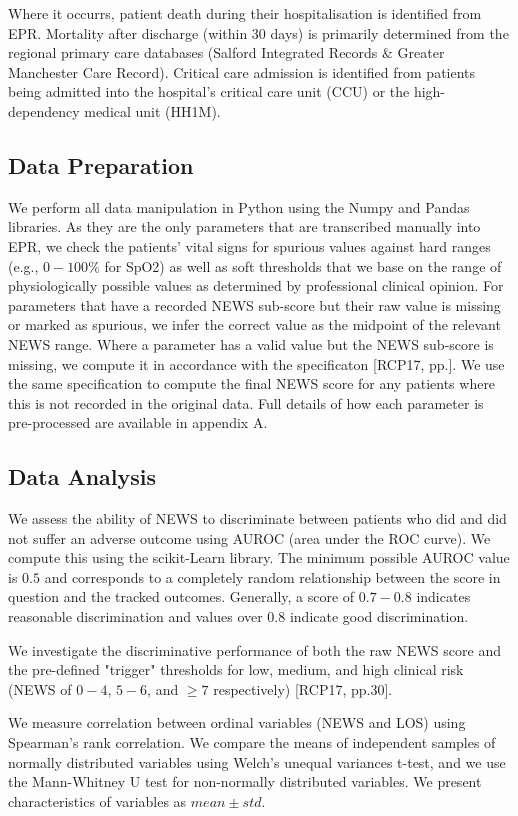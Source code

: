 \documentclass[10pt,journal,compsoc]{IEEEtran}
\begin{document}
Where it occurrs, patient death during their hospitalisation is identified from EPR. Mortality after discharge (within 30 days) is primarily determined from the regional primary care databases (Salford Integrated Records \& Greater Manchester Care Record). Critical care admission is identified from patients being admitted into the hospital's critical care unit (CCU) or the high-dependency medical unit (HH1M).

\subsection{Data Preparation} We perform all data manipulation in Python using the Numpy and Pandas libraries. As they are the only parameters that are transcribed manually into EPR, we check the patients' vital signs for spurious values against hard ranges (e.g., $0-100\%$ for SpO2) as well as soft thresholds that we base on the range of physiologically possible values as determined by professional clinical opinion. For parameters that have a recorded NEWS sub-score but their raw value is missing or marked as spurious, we infer the correct value as the midpoint of the relevant NEWS range. Where a parameter has a valid value but the NEWS sub-score is missing, we compute it in accordance with the specificaton [RCP17, pp.]. We use the same specification to compute the final NEWS score for any patients where this is not recorded in the original data. Full details of how each parameter is pre-processed are available in appendix A.

\subsection{Data Analysis} We assess the ability of NEWS to discriminate between patients who did and did not suffer an adverse outcome using AUROC (area under the ROC curve). We compute this using the scikit-Learn library. The minimum possible AUROC value is $0.5$ and corresponds to a completely random relationship between the score in question and the tracked outcomes. Generally, a score of $0.7-0.8$ indicates reasonable discrimination and values over $0.8$ indicate good discrimination.

We investigate the discriminative performance of both the raw NEWS score and the pre-defined "trigger" thresholds for low, medium, and high clinical risk (NEWS of $0-4$, $5-6$, and $\geq 7$ respectively) [RCP17, pp.30].

We measure correlation between ordinal variables (NEWS and LOS) using Spearman's rank correlation. We compare the means of independent samples of normally distributed variables using Welch's unequal variances t-test, and we use the Mann-Whitney U test for non-normally distributed variables. We present characteristics of variables as $mean \pm std$.
\end{document}

